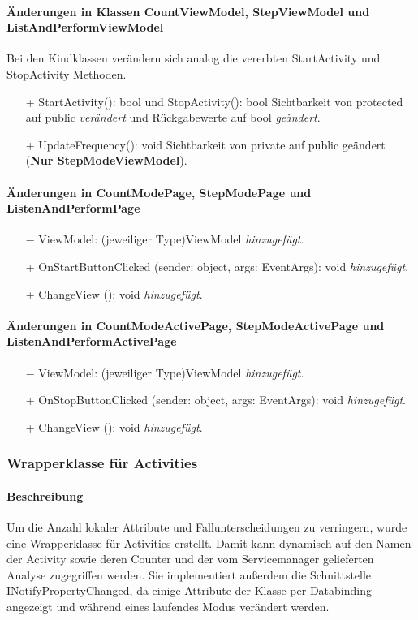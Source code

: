 \documentclass[a4paper,12pt]{article}
\begin{document}
\paragraph{Änderungen in Klassen CountViewModel, StepViewModel und ListAndPerformViewModel}
Bei den Kindklassen verändern sich analog die vererbten StartActivity und StopActivity Methoden.
\begin{itemize}
	\item[+] StartActivity(): bool und StopActivity(): bool Sichtbarkeit von protected auf public \textit{verändert} und Rückgabewerte auf bool \textit{geändert}.
	\item[+] UpdateFrequency(): void Sichtbarkeit von private auf public geändert (\textbf{Nur StepModeViewModel}). 
\end{itemize}
\paragraph{Änderungen in CountModePage, StepModePage und ListenAndPerformPage}
\begin{itemize}
	\item[$-$] ViewModel: (jeweiliger Type)ViewModel \textit{hinzugefügt}.
	\item[+] OnStartButtonClicked (sender: object, args: EventArgs): void \textit{hinzugefügt}.
	\item[+] ChangeView (): void \textit{hinzugefügt}.
\end{itemize}
\paragraph{Änderungen in CountModeActivePage, StepModeActivePage und ListenAndPerformActivePage}
\begin{itemize}
	\item[$-$] ViewModel: (jeweiliger Type)ViewModel \textit{hinzugefügt}.
	\item[+] OnStopButtonClicked (sender: object, args: EventArgs): void \textit{hinzugefügt}.
	\item[+] ChangeView (): void \textit{hinzugefügt}.
\end{itemize}

\subsubsection{Wrapperklasse für Activities}
\paragraph{Beschreibung}
Um die Anzahl lokaler Attribute und Fallunterscheidungen zu verringern, wurde eine Wrapperklasse für Activities  erstellt. Damit kann dynamisch auf den Namen der Activity sowie deren Counter und der vom Servicemanager gelieferten Analyse zugegriffen werden. Sie implementiert außerdem die Schnittstelle INotifyPropertyChanged, da einige Attribute der Klasse per Databinding angezeigt und während eines laufendes Modus verändert werden.
\end{document}
